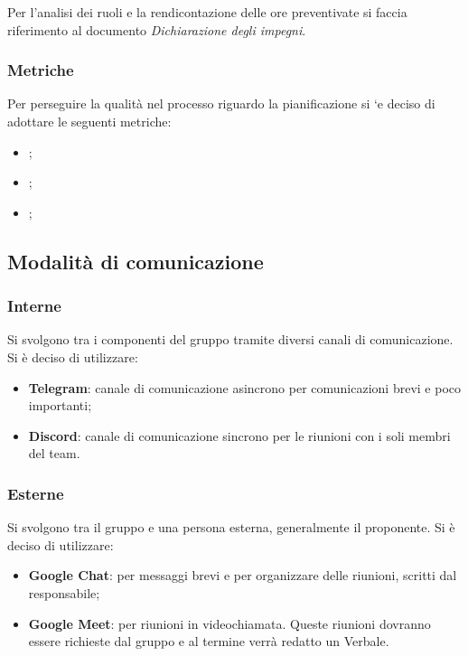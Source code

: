             Per l'analisi dei ruoli e la rendicontazione delle ore preventivate si faccia riferimento al documento \textit{Dichiarazione degli impegni}.
            
            \subsubsection{Metriche}
            Per perseguire la qualità nel processo riguardo la pianificazione si `e deciso di adottare le seguenti metriche:
            \begin{itemize}
                    \item {};
                    \item {};
                    \item {};
            \end{itemize}
    
    \subsection{Modalità di comunicazione}
        \subsubsection{Interne}
        Si svolgono tra i componenti del gruppo tramite diversi canali di comunicazione.\\
        Si è deciso di utilizzare:
        \begin{itemize}
            \item \textbf{Telegram}: canale di comunicazione asincrono per comunicazioni brevi e poco importanti;
            \item \textbf{Discord}: canale di comunicazione sincrono per le riunioni con i soli membri del team.\\ 
        \end{itemize}
        \subsubsection{Esterne}
        Si svolgono tra il gruppo e una persona esterna, generalmente il proponente.
        Si è deciso di utilizzare:
        \begin{itemize}
            \item \textbf{Google Chat}: per messaggi brevi e per organizzare delle riunioni, scritti dal responsabile;
            \item \textbf{Google Meet}: per riunioni in videochiamata. Queste riunioni dovranno essere richieste
            dal gruppo e al termine verrà redatto un Verbale.
        \end{itemize}


